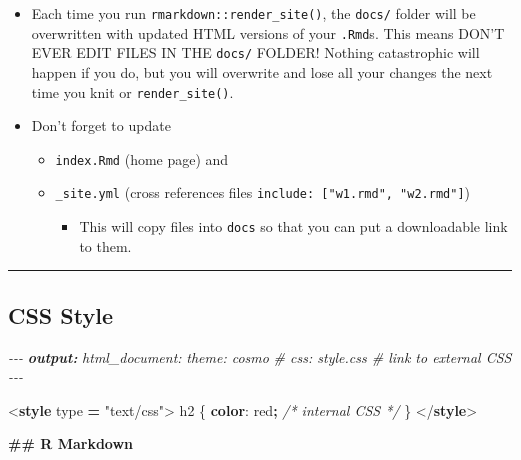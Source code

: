 \documentclass[
  a4paper,
  twoside,
  openright]{book}
\newenvironment{Shaded}{\begin{snugshade}}{\end{snugshade}}
\newcommand{\AnnotationTok}[1]{\textcolor[rgb]{0.56,0.35,0.01}{\textbf{\textit{#1}}}}
\newcommand{\CharTok}[1]{\textcolor[rgb]{0.31,0.60,0.02}{#1}}
\newcommand{\CommentTok}[1]{\textcolor[rgb]{0.56,0.35,0.01}{\textit{#1}}}
\newcommand{\ConstantTok}[1]{\textcolor[rgb]{0.56,0.35,0.01}{#1}}
\newcommand{\DataTypeTok}[1]{\textcolor[rgb]{0.13,0.29,0.53}{#1}}
\newcommand{\FunctionTok}[1]{\textcolor[rgb]{0.13,0.29,0.53}{\textbf{#1}}}
\newcommand{\KeywordTok}[1]{\textcolor[rgb]{0.13,0.29,0.53}{\textbf{#1}}}
\newcommand{\NormalTok}[1]{#1}
\newcommand{\OperatorTok}[1]{\textcolor[rgb]{0.81,0.36,0.00}{\textbf{#1}}}
\newcommand{\OtherTok}[1]{\textcolor[rgb]{0.56,0.35,0.01}{#1}}
\newcommand{\StringTok}[1]{\textcolor[rgb]{0.31,0.60,0.02}{#1}}
\providecommand{\tightlist}{%
  \setlength{\itemsep}{0pt}\setlength{\parskip}{0pt}}
\theoremstyle{definition}
\theoremstyle{definition}
\theoremstyle{definition}
\theoremstyle{definition}
\theoremstyle{remark}
\begin{document}
\begin{itemize}
\tightlist
\item
  Each time you run \texttt{rmarkdown::render\_site()}, the \texttt{docs/} folder will be overwritten with updated HTML versions of your \texttt{.Rmd}s. This means DON'T EVER EDIT FILES IN THE \texttt{docs/} FOLDER! Nothing catastrophic will happen if you do, but you will overwrite and lose all your changes the next time you knit or \texttt{render\_site()}.
\item
  Don't forget to update

  \begin{itemize}
  \tightlist
  \item
    \texttt{index.Rmd} (home page) and
  \item
    \texttt{\_site.yml} (cross references files \texttt{include:\ {[}"w1.rmd",\ "w2.rmd"{]}})

    \begin{itemize}
    \tightlist
    \item
      This will copy files into \texttt{docs} so that you can put a downloadable link to them.
    \end{itemize}
  \end{itemize}
\end{itemize}

\begin{center}\rule{0.5\linewidth}{0.5pt}\end{center}

\subsection*{CSS Style}\label{css-style}

\begin{Shaded}
\begin{Highlighting}[]
\CommentTok{{-}{-}{-}}
\AnnotationTok{output:}\CommentTok{ }
\CommentTok{  html\_document:}
\CommentTok{    theme: cosmo}
\CommentTok{   \# css: style.css \# link to external CSS}
\CommentTok{{-}{-}{-}}

\DataTypeTok{\textless{}}\KeywordTok{style}\OtherTok{ type }\OperatorTok{=} \StringTok{"text/css"}\DataTypeTok{\textgreater{}} 
\NormalTok{h2 \{}
  \KeywordTok{color}\CharTok{:} \ConstantTok{red}\OperatorTok{;} \CommentTok{/* internal CSS */}
\NormalTok{\}}
\DataTypeTok{\textless{}/}\KeywordTok{style}\DataTypeTok{\textgreater{}}

\FunctionTok{\#\# R Markdown}
\end{Highlighting}
\end{Shaded}
\end{document}
